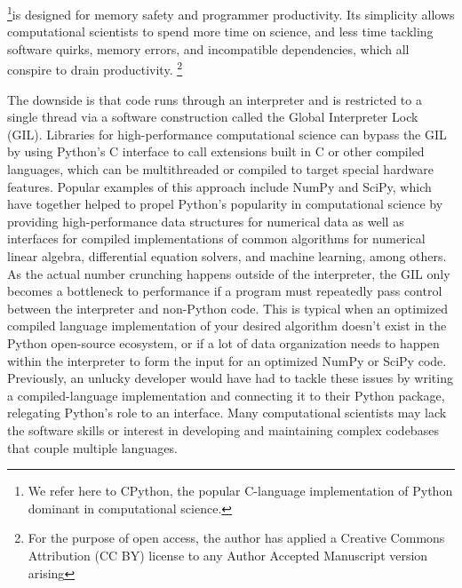 \documentclass{IEEEcsmag}
\newcommand\blfootnote[1]{%
  \begingroup
  \renewcommand\thefootnote{}\footnote{#1}%
  \addtocounter{footnote}{-1}%
  \endgroup
}
\begin{document}
\maketitle
{}\footnote{We refer here to CPython, the popular C-language implementation of Python dominant in computational science.}is designed for memory safety and programmer productivity. Its simplicity allows computational scientists to spend more time on science, and less time tackling software quirks, memory errors, and incompatible dependencies, which all conspire to drain productivity.\blfootnote{For the purpose of open access, the author has applied a Creative Commons Attribution (CC BY) license to any Author Accepted Manuscript version arising} 
The downside is that code runs through an interpreter and is restricted to a single thread via a software construction called the Global Interpreter Lock (GIL). Libraries for high-performance computational science can bypass the GIL by using Python's C interface to call extensions built in C or other compiled languages, which can be multithreaded or compiled to target special hardware features. Popular examples of this approach include NumPy and SciPy, which have together helped to propel Python's popularity in computational science by providing high-performance data structures for numerical data as well as interfaces for compiled implementations of common algorithms for numerical linear algebra, differential equation solvers, and machine learning, among others.
As the actual number crunching happens outside of the interpreter, the GIL only becomes a bottleneck to performance if a program must repeatedly pass control between the interpreter and non-Python code. This is  typical when an optimized compiled language implementation of your desired algorithm doesn't exist in the Python open-source ecosystem, or if a lot of data organization needs to happen within the interpreter to form the input for an optimized NumPy or SciPy code. Previously, an unlucky developer would have had to tackle these issues by writing a compiled-language implementation and connecting it to their Python package, relegating Python's role to an interface. Many computational scientists may lack the software skills or interest in developing and maintaining complex codebases that couple multiple languages.
\end{document}
